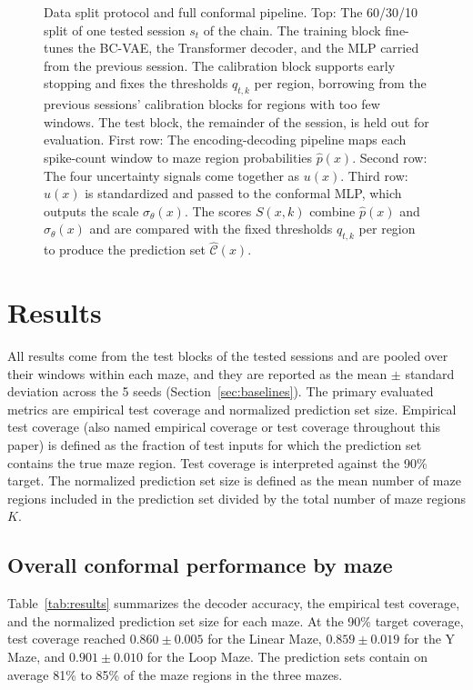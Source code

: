 \documentclass{article}
\begin{document}
\begin{figure}[ht]
{
  }
  \makeatother
  \caption{Data split protocol and full conformal pipeline. Top: The 60/30/10 split of one tested session $s_t$ of the chain. The training block fine-tunes the BC-VAE, the Transformer decoder, and the MLP carried from the previous session. The calibration block supports early stopping and fixes the thresholds $\hat q_{t,k}$ per region, borrowing from the previous sessions' calibration blocks for regions with too few windows. The test block, the remainder of the session, is held out for evaluation. First row: The encoding-decoding pipeline maps each spike-count window to maze region probabilities $\hat p(x)$. Second row: The four uncertainty signals come together as $u(x)$. Third row: $u(x)$ is standardized and passed to the conformal MLP, which outputs the scale $\sigma_\theta(x)$. The scores $S(x,k)$ combine $\hat p(x)$ and $\sigma_\theta(x)$ and are compared with the fixed thresholds $\hat q_{t,k}$ per region to produce the prediction set $\widehat{\mathcal{C}}(x)$.}
  \label{fig:pipeline}
\end{figure}

\FloatBarrier
\section{Results}
All results come from the test blocks of the tested sessions and are pooled over their windows within each maze, and they are reported as the mean $\pm$ standard deviation across the 5 seeds (Section~\ref{sec:baselines}). The primary evaluated metrics are empirical test coverage and normalized prediction set size. Empirical test coverage (also named empirical coverage or test coverage throughout this paper) is defined as the fraction of test inputs for which the prediction set contains the true maze region. Test coverage is interpreted against the 90\% target. The normalized prediction set size is defined as the mean number of maze regions included in the prediction set divided by the total number of maze regions $K$.

\FloatBarrier
\subsection{Overall conformal performance by maze}
Table~\ref{tab:results} summarizes the decoder accuracy, the empirical test coverage, and the normalized prediction set size for each maze. At the 90\% target coverage, test coverage reached $0.860\pm0.005$ for the Linear Maze, $0.859\pm0.019$ for the Y Maze, and $0.901\pm0.010$ for the Loop Maze. The prediction sets contain on average 81\% to 85\% of the maze regions in the three mazes.
\end{document}
